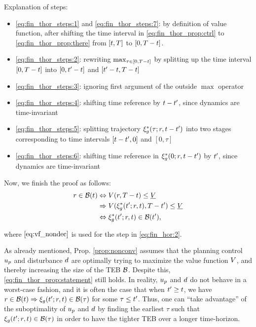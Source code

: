 \begin{IEEEproof}
Explanation of steps:
\begin{itemize}
  \item \eqref{eq:fin_thor_steps:1} and \eqref{eq:fin_thor_steps:7}: by definition of value function, after shifting the time interval in \eqref{eq:fin_thor_prop:ctrl} to \eqref{eq:fin_thor_prop:there} from $[t, T]$ to $[0, T-t]$.
  \item \eqref{eq:fin_thor_steps:2}: rewriting $\max_{\tau \in [0, T-t]}$ by splitting up the time interval $[0, T-t]$ into $[0, t'-t]$ and $[t'-t, T-t]$
  \item \eqref{eq:fin_thor_steps:3}: ignoring first argument of the outside $\max$ operator
  \item \eqref{eq:fin_thor_steps:4}: shifting time reference by $t-t'$, since dynamics are time-invariant
  \item \eqref{eq:fin_thor_steps:5}: splitting trajectory $\xi_g^*(\tau; r, t-t')$ into two stages corresponding to time intervals $[t-t', 0]$ and $[0, \tau]$
  \item \eqref{eq:fin_thor_steps:6}: shifting time reference in $\xi_g^*(0; r, t-t')$ by $t'$, since dynamics are time-invariant
\end{itemize}

Now, we finish the proof as follows:
\begin{subequations} \label{eq:fin_hor}
  \begin{align}
  \rstate \in \TEB(\tvar) &\Leftrightarrow \valfunc(\rstate, \thor - \tvar) \le \underline\valfunc \\
  & \Rightarrow  \valfunc(\rtraj^*(\tvar'; \rstate, \tvar), \thor - \tvar') \le \underline\valfunc \label{eq:fin_hor:2}\\
  & \Leftrightarrow \rtraj^*(\tvar'; \rstate, \tvar) \in \TEB(\tvar'),
  \end{align}
\end{subequations}

\noindent where $\eqref{eq:vf_nondec}$ is used for the step in \eqref{eq:fin_hor:2}.

\end{IEEEproof} 

\begin{rem}
  As already mentioned, Prop. \ref{prop:nonconv} assumes that the planning control $u_p$ and disturbance $d$ are optimally trying to maximize the value function $V$, and thereby increasing the size of the TEB $\mathcal B$.
  Despite this, \eqref{eq:fin_thor_prop:statement} still holds.
  In reality, $u_p$ and $d$ do not behave in a worst-case fashion, and it is often the case that when $t' \ge t$, we have $r \in \mathcal B(t) \Rightarrow \xi_g(t'; r, t) \in \mathcal B(\tau)$ for some $\tau \le t'$.
  Thus, one can ``take advantage'' of the suboptimality of $u_p$ and $d$ by finding the earliest $\tau$ such that $\xi_g(t'; r, t) \in \mathcal B(\tau)$ in order to have the tighter TEB over a longer time-horizon.
\end{rem}

